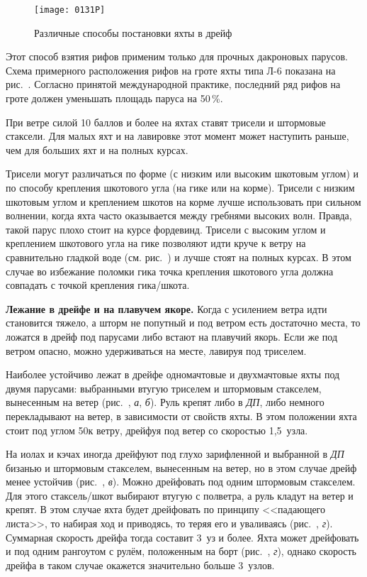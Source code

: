 \begin{figure*}[htb]
  \centering{}
  \texttt{[image: 0131P]}
  \caption{Различные способы постановки яхты в дрейф}
  \label{fig:131}
\end{figure*}

Этот способ взятия рифов применим только для прочных дакроновых
парусов. Схема примерного расположения рифов на гроте яхты типа Л-6
показана на рис.~. Согласно принятой международной практике,
последний ряд рифов на гроте должен уменьшать площадь паруса на
50\,\%.

При ветре силой 10 баллов и более на яхтах ставят трисели и штормовые
стаксели. Для малых яхт и на лавировке этот момент может наступить
раньше, чем для больших яхт и на полных курсах.

Трисели могут различаться по форме (с низким или высоким шкотовым
углом) и по способу крепления шкотового угла (на гике или на
корме). Трисели с низким шкотовым углом и креплением шкотов на корме
лучше использовать при сильном волнении, когда яхта часто оказывается
между гребнями высоких волн. Правда, такой парус плохо стоит на курсе
фордевинд. Трисели с высоким углом и креплением шкотового угла на гике
позволяют идти круче к ветру на сравнительно гладкой воде
(см. рис.~) и лучше стоят на полных курсах. В этом случае во
избежание поломки гика точка крепления шкотового угла должна совпадать
с точкой крепления гика\-/шкота.

\textbf{Лежание в дрейфе и на плавучем
  якоре.} Когда с усилением ветра
идти становится тяжело, а шторм не попутный и под ветром есть
достаточно места, то ложатся в дрейф под парусами либо встают на
плавучий якорь. Если же под ветром опасно, можно удерживаться на
месте, лавируя под триселем.

Наиболее устойчиво лежат в дрейфе одномачтовые и двухмачтовые яхты под
двумя парусами: выбранными втугую триселем и штормовым стакселем,
вынесенным на ветер (рис.~, \textit{а}, \textit{б}). Руль
крепят либо в \textit{ДП}, либо немного перекладывают на ветер, в
зависимости от свойств яхты. В этом положении яхта стоит под углом
50\gr к ветру, дрейфуя под ветер со скоростью 1,5~узла.

На иолах и кэчах иногда дрейфуют под глухо зарифленной и выбранной в
\textit{ДП} бизанью и штормовым стакселем, вынесенным на ветер, но в
этом случае дрейф менее устойчив (рис.~, \textit{в}). Можно
дрейфовать под одним штормовым стакселем. Для этого стаксель\-/шкот
выбирают втугую с полветра, а руль кладут на ветер и крепят. В этом
случае яхта будет дрейфовать по принципу <<падающего листа>>, то
набирая ход и приводясь, то теряя его и уваливаясь (рис.~,
\textit{г}). Суммарная скорость дрейфа тогда составит 3~уз и
более. Яхта может дрейфовать и под одним рангоутом с рулём, положенным
на борт (рис.~, \textit{г}), однако скорость дрейфа в таком
случае окажется значительно больше 3~узлов.


